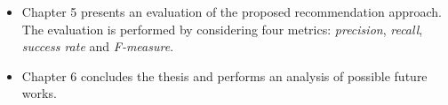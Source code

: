 \begin{itemize}
	\item Chapter 5 presents an evaluation of the proposed recommendation 
	approach.
	The evaluation is performed by 
	considering four metrics: \textit{precision}, \textit{recall}, 
	\textit{success rate} and \textit{F-measure}. 

	\item Chapter 6 concludes the thesis and performs an analysis of possible 
	future works.
	
\end{itemize}

